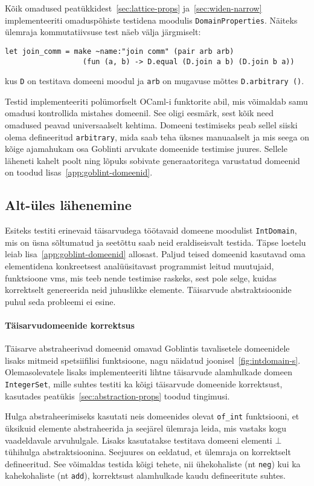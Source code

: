 \documentclass[../thesis.tex]{subfiles}
\begin{document}
Kõik omadused peatükkidest~\ref{sec:lattice-props} ja~\ref{sec:widen-narrow} implementeeriti omaduspõhiste testidena moodulis \texttt{DomainProperties}. Näiteks ülemraja kommutatiivsuse test näeb välja järgmiselt:
\begin{verbatim}
let join_comm = make ~name:"join comm" (pair arb arb)
                  (fun (a, b) -> D.equal (D.join a b) (D.join b a))
\end{verbatim}
kus \texttt{D} on testitava domeeni moodul ja \texttt{arb} on mugavuse mõttes \texttt{D.arbitrary ()}.

Testid implementeeriti polümorfselt OCaml-i funktorite abil, mis võimaldab samu omadusi kontrollida mistahes domeenil. See oligi eesmärk, sest kõik need omadused peavad universaalselt kehtima. Domeeni testimiseks peab sellel siiski olema defineeritud \texttt{arbitrary}, mida saab teha üksnes manuaalselt ja mis seega on kõige ajamahukam osa Goblinti arvukate domeenide testimise juures. Sellele läheneti kahelt poolt ning lõpuks sobivate generaatoritega varustatud domeenid on toodud lisas~\ref{app:goblint-domeenid}.

\subsection{Alt-üles lähenemine}
Esiteks testiti erinevaid täisarvudega töötavaid domeene moodulist \texttt{IntDomain}, mis on üsna sõltumatud ja seetõttu saab neid eraldiseisvalt testida. Täpse loetelu leiab lisa~\ref{app:goblint-domeenid} allosast. Paljud teised domeenid kasutavad oma elementidena konkreetsest analüüsitavast programmist leitud muutujaid, funktsioone vms, mis teeb nende testimise raskeks, sest pole selge, kuidas korrektselt genereerida neid juhuslikke elemente. Täisarvude abstraktsioonide puhul seda probleemi ei esine.

\paragraph{Täisarvudomeenide korrektsus}
Täisarve abstraheerivad domeenid omavad Goblintis tavalisetele domeenidele lisaks mitmeid spetsiifilisi funktsioone, nagu näidatud joonisel~\ref{fig:intdomain-s}.
Olemasolevatele lisaks implementeeriti lihtne täisarvude alamhulkade domeen \texttt{IntegerSet}, mille suhtes testiti ka kõigi täisarvude domeenide korrektsust, kasutades peatükis~\ref{sec:abstraction-props} toodud tingimusi.

Hulga abstraheerimiseks kasutati neis domeenides olevat \texttt{of\_int} funktsiooni, et üksikuid elemente abstraheerida ja seejärel ülemraja leida, mis vastaks kogu vaadeldavale arvuhulgale. Lisaks kasutatakse testitava domeeni elementi $\bot$ tühihulga abstraktsioonina. Seejuures on eeldatud, et ülemraja on korrektselt defineeritud. See võimaldas testida kõigi tehete, nii ühekohaliste (nt \texttt{neg}) kui ka kahekohaliste (nt \texttt{add}), korrektsust alamhulkade kaudu defineeritute suhtes.
\end{document}
